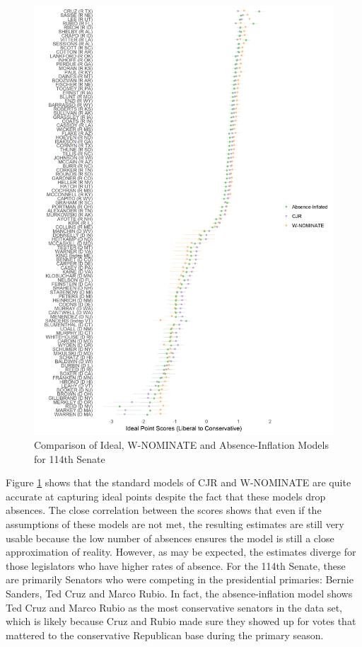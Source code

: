 	\begin{figure}
		\centering
		\caption{Comparison of Ideal, W-NOMINATE and Absence-Inflation Models for 114th Senate}\label{compare_con}
			\includegraphics[width=\linewidth]{all_perf}
	\end{figure}
	
	Figure \ref{compare_con} shows that the standard models of CJR and W-NOMINATE are quite accurate at capturing ideal points despite the fact that these models drop absences. The close correlation between the scores shows that even if the assumptions of these models are not met, the resulting estimates are still very usable because the low number of absences ensures the model is still a close approximation of reality. However, as may be expected, the estimates diverge for those legislators who have higher rates of absence. For the 114th Senate, these are primarily Senators who were competing in the presidential primaries: Bernie Sanders, Ted Cruz and Marco Rubio. In fact, the absence-inflation model shows Ted Cruz and Marco Rubio as the most conservative senators in the data set, which is likely because Cruz and Rubio made sure they showed up for votes that mattered to the conservative Republican base during the primary season.
	
